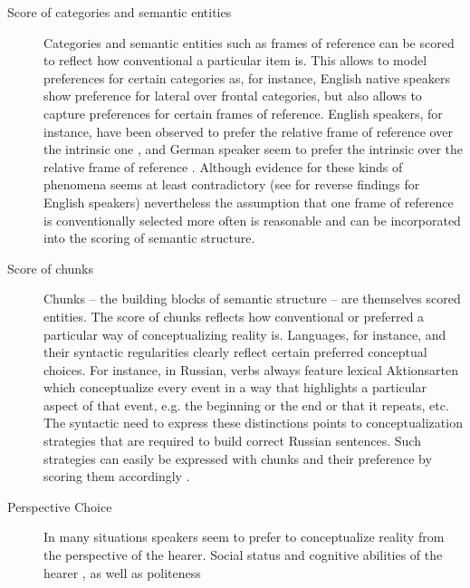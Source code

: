 \begin{description}
\item[Score of categories and semantic entities]
Categories and semantic entities such as frames of reference can be 
scored to reflect how 
conventional a particular item is. This allows to model preferences for
certain categories as, for instance, English native speakers show
preference for lateral over frontal categories, but also allows to 
capture \citep{tversky1999speakers} preferences for certain 
frames of reference. English speakers, for instance, 
have been observed to prefer the relative frame of reference
over the intrinsic one \citep{levinson2003space},
and German speaker seem to prefer the intrinsic over the relative frame of reference 
\citep{ehrich1985linguistik}. Although evidence for these kinds of phenomena
seems at least contradictory (see \citealp{miller1976language} for 
reverse findings for English speakers) nevertheless the assumption
that one frame of reference is conventionally selected more often 
is reasonable and can be incorporated into the 
scoring of semantic structure.
\item[Score of chunks]
Chunks -- the building blocks of semantic structure -- are themselves scored entities.
The score of chunks reflects how conventional or preferred a 
particular way of conceptualizing reality is. Languages, for instance, and their
syntactic regularities clearly reflect certain preferred conceptual choices. For instance,
in Russian, verbs always feature lexical Aktionsarten which conceptualize every event
in a way that highlights a particular aspect of that event, e.g. the beginning or the end or
that it repeats, etc. The syntactic need to express
these distinctions points to conceptualization strategies that are required to
build correct Russian sentences. Such strategies can easily be expressed with chunks
and their preference by scoring them accordingly \citep{gerasymova2010acquisition}.
\item[Perspective Choice]
In many situations speakers seem to prefer to conceptualize
reality from the perspective of the hearer. Social status and
cognitive abilities of the hearer \citep{mainwaring2003descriptions}, 
as well as politeness \citep{schober1993spatial} 

\end{description}
